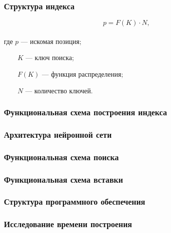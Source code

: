 \documentclass[8pt,table]{bmstu-pr}
\begin{document}
\begin{frame}
    \fontsize{22pt}{22pt}\selectfont
    \frametitle{Структура индекса}

    \begin{minipage}{0.40\textwidth}
    \end{minipage} \hfill
    \begin{minipage}{0.55\textwidth}
        \begin{equation*}
            p = F(K) \cdot N,
        \end{equation*}
        ~\\

        где $p$ --- искомая позиция;

        ~~~~$K$ --- ключ поиска;

        ~~~~$F(K)$ --- функция распределения;

        ~~~~$N$ --- количество ключей.
    \end{minipage}

\end{frame}

\begin{frame}
    \frametitle{Функциональная схема построения индекса}
\end{frame}

\begin{frame}
    \frametitle{Архитектура нейронной сети}
\end{frame}

\begin{frame}
    \frametitle{Функциональная схема поиска}
\end{frame}

\begin{frame}
    \frametitle{Функциональная схема вставки}
\end{frame}


\begin{frame}
    \frametitle{Структура программного обеспечения}
\end{frame}

\begin{frame}
    \frametitle{Исследование времени построения}
    \begin{minipage}{\textwidth}
    \end{minipage}
\end{frame}
\end{document}
